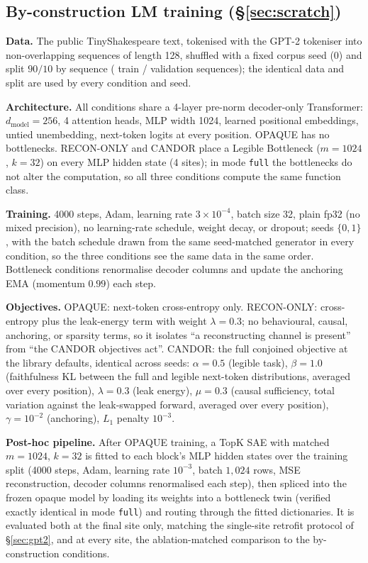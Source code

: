 \documentclass[11pt]{article}
\providecommand{\lmLayers}{4}\providecommand{\lmDModel}{256}\providecommand{\lmHeads}{4}
\providecommand{\lmDMlp}{1024}\providecommand{\lmDictM}{1024}\providecommand{\lmTopK}{32}
\providecommand{\lmSeqLen}{128}\providecommand{\lmSteps}{4000}\providecommand{\lmBatch}{32}
\begin{document}
\subsection{By-construction LM training (\S\ref{sec:scratch})}
\textbf{Data.} The public TinyShakespeare text, tokenised with the GPT-2 tokeniser
into non-overlapping sequences of length \lmSeqLen{}, shuffled with a fixed corpus
seed ($0$) and split $90/10$ by sequence (\lmTrainSeqs{} train / \lmValSeqs{}
validation sequences); the identical data and split are used by every condition and
seed.

\textbf{Architecture.} All conditions share a \lmLayers{}-layer pre-norm decoder-only
Transformer: $d_{\mathrm{model}}=\lmDModel$, \lmHeads{} attention heads, MLP width
\lmDMlp{}, learned positional embeddings, untied unembedding, next-token logits at
every position. OPAQUE has no bottlenecks. RECON-ONLY and CANDOR place a Legible
Bottleneck ($m=\lmDictM$, $k=\lmTopK$) on every MLP hidden state (\lmLayers{} sites);
in mode \texttt{full} the bottlenecks do not alter the computation, so all three
conditions compute the same function class.

\textbf{Training.} \lmSteps{} steps, Adam, learning rate $3\times10^{-4}$, batch size
\lmBatch{}, plain fp32 (no mixed precision), no learning-rate schedule, weight decay,
or dropout; seeds $\{0, 1\}$, with the batch schedule drawn from the same
seed-matched generator in every condition, so the three conditions see the same data
in the same order. Bottleneck conditions renormalise decoder columns and update the
anchoring EMA (momentum $0.99$) each step.

\textbf{Objectives.} OPAQUE: next-token cross-entropy only. RECON-ONLY:
cross-entropy plus the leak-energy term with weight $\lambda=0.3$; no behavioural,
causal, anchoring, or sparsity terms, so it isolates ``a reconstructing channel is
present'' from ``the CANDOR objectives act''. CANDOR: the full conjoined objective at
the library defaults, identical across seeds: $\alpha=0.5$ (legible task),
$\beta=1.0$ (faithfulness KL between the full and legible next-token distributions,
averaged over every position), $\lambda=0.3$ (leak energy), $\mu=0.3$ (causal
sufficiency, total variation against the leak-swapped forward, averaged over every
position), $\gamma=10^{-2}$ (anchoring), $L_1$ penalty $10^{-3}$.

\textbf{Post-hoc pipeline.} After OPAQUE training, a TopK SAE with matched
$m=\lmDictM$, $k=\lmTopK$ is fitted to each block's MLP hidden states over the
training split (\lmSteps{} steps, Adam, learning rate $10^{-3}$, batch $1{,}024$
rows, MSE reconstruction, decoder columns renormalised each step), then spliced into
the frozen opaque model by loading its weights into a bottleneck twin (verified
exactly identical in mode \texttt{full}) and routing through the fitted dictionaries.
It is evaluated both at the final site only, matching the single-site retrofit
protocol of \S\ref{sec:gpt2}, and at every site, the ablation-matched comparison to
the by-construction conditions.
\end{document}
